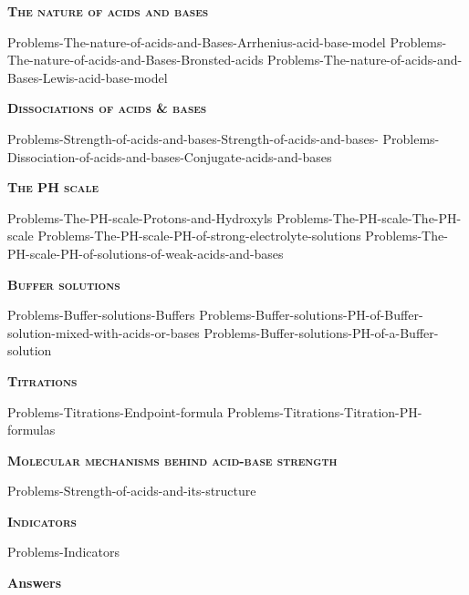 \documentclass[main.tex]{subfiles}
\begin{document}
\newpage
 
\fancyhfoffset[E,O]{0pt}
\setlength{\columnsep}{30pt}
\begin{conclusion}
\end{conclusion}
\begin{multicols*}{2}\setcounter{numA}{1}
{\raggedright\textsc{\textbf{The nature of acids and bases}}\par}
 {Problems-The-nature-of-acids-and-Bases-Arrhenius-acid-base-model}
 {Problems-The-nature-of-acids-and-Bases-Bronsted-acids}
 {Problems-The-nature-of-acids-and-Bases-Lewis-acid-base-model}
{\raggedright\textsc{\textbf{Dissociations of acids \& bases}}\par}
 {Problems-Strength-of-acids-and-bases-Strength-of-acids-and-bases-}
 {Problems-Dissociation-of-acids-and-bases-Conjugate-acids-and-bases}
 
{\raggedright\textsc{\textbf{The PH scale}}\par}
 {Problems-The-PH-scale-Protons-and-Hydroxyls}
 {Problems-The-PH-scale-The-PH-scale}
 {Problems-The-PH-scale-PH-of-strong-electrolyte-solutions}
 {Problems-The-PH-scale-PH-of-solutions-of-weak-acids-and-bases}
			
{\raggedright\textsc{\textbf{Buffer solutions}}\par}
 {Problems-Buffer-solutions-Buffers}
 {Problems-Buffer-solutions-PH-of-Buffer-solution-mixed-with-acids-or-bases}
 {Problems-Buffer-solutions-PH-of-a-Buffer-solution}
{\raggedright\textsc{\textbf{Titrations}}\par}
 {Problems-Titrations-Endpoint-formula}
 {Problems-Titrations-Titration-PH-formulas}
 {\raggedright\textsc{\textbf{Molecular mechanisms behind acid-base strength}}\par}
 {Problems-Strength-of-acids-and-its-structure}
 {\raggedright\textsc{\textbf{Indicators}}\par}
 {Problems-Indicators}
\end{multicols*}
\newpage
\begin{answersenvironment}
\begin{minipage}[c]{1\textwidth}
\begin{localsize}{10}
{\Large \bf Answers}
  \printsolutions[byID={1,3,5,7,9,11,13,15,17,19,21,23,25,27,29,31,33,35,37, 39, 41, 43, 45, 47, 49, 51,53,55,57,59}]
\end{localsize}
\end{minipage}\end{answersenvironment}
\end{document}

